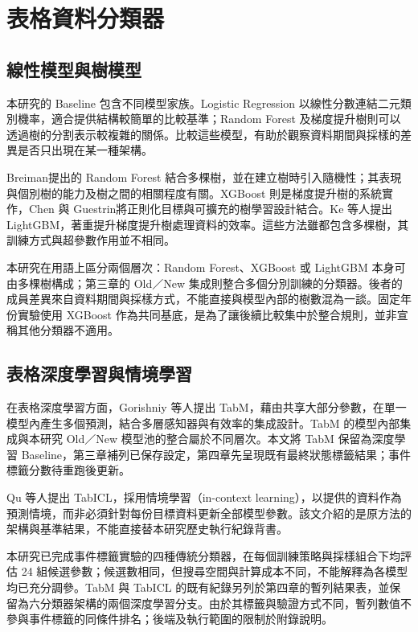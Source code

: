 \section{表格資料分類器}

\subsection{線性模型與樹模型}

本研究的 Baseline 包含不同模型家族。Logistic Regression 以線性分數連結二元類別機率，適合提供結構較簡單的比較基準；Random Forest 及梯度提升樹則可以透過樹的分割表示較複雜的關係。比較這些模型，有助於觀察資料期間與採樣的差異是否只出現在某一種架構。

Breiman\autocite{breiman2001rf}提出的 Random Forest 結合多棵樹，並在建立樹時引入隨機性；其表現與個別樹的能力及樹之間的相關程度有關。XGBoost 則是梯度提升樹的系統實作，Chen 與 Guestrin\autocite{chen2016xgboost}將正則化目標與可擴充的樹學習設計結合。Ke 等人\autocite{ke2017lightgbm}提出 LightGBM，著重提升梯度提升樹處理資料的效率。這些方法雖都包含多棵樹，其訓練方式與超參數作用並不相同。

本研究在用語上區分兩個層次：Random Forest、XGBoost 或 LightGBM 本身可由多棵樹構成；第三章的 Old／New 集成則整合多個分別訓練的分類器。後者的成員差異來自資料期間與採樣方式，不能直接與模型內部的樹數混為一談。固定年份實驗使用 XGBoost 作為共同基底，是為了讓後續比較集中於整合規則，並非宣稱其他分類器不適用。

\subsection{表格深度學習與情境學習}

在表格深度學習方面，Gorishniy 等人\autocite{gorishniy2025tabm}提出 TabM，藉由共享大部分參數，在單一模型內產生多個預測，結合多層感知器與有效率的集成設計。TabM 的模型內部集成與本研究 Old／New 模型池的整合屬於不同層次。本文將 TabM 保留為深度學習 Baseline，第三章補列已保存設定，第四章先呈現既有最終狀態標籤結果；事件標籤分數待重跑後更新。

Qu 等人\autocite{qu2025tabicl}提出 TabICL，採用情境學習（in-context learning），以提供的資料作為預測情境，而非必須針對每份目標資料更新全部模型參數。該文介紹的是原方法的架構與基準結果，不能直接替本研究歷史執行紀錄背書。

本研究已完成事件標籤實驗的四種傳統分類器，在每個訓練策略與採樣組合下均評估 24 組候選參數；候選數相同，但搜尋空間與計算成本不同，不能解釋為各模型均已充分調參。TabM 與 TabICL 的既有紀錄另列於第四章的暫列結果表，並保留為六分類器架構的兩個深度學習分支。由於其標籤與驗證方式不同，暫列數值不參與事件標籤的同條件排名；後端及執行範圍的限制於附錄說明。

